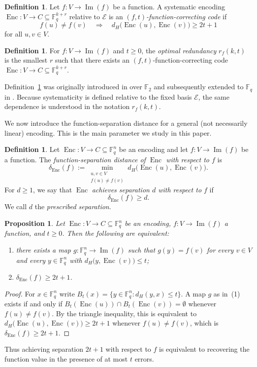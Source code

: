 \documentclass[a4paper,12pt]{article}
\theoremstyle{plain}
\newtheorem{proposition}[lemma]{Proposition}
\theoremstyle{definition}
\newtheorem{definition}[lemma]{Definition}
\newcommand{\F}{\mathbb F}
\newcommand{\Enc}{\operatorname{Enc}}
\newcommand{\Imf}{\operatorname{Im}}
\begin{document}
\begin{definition}
\label{def:fcc}
Let $f\colon V\to\Imf(f)$ be a function. A systematic encoding
$\Enc\colon V\to C\subseteq\F_q^{k+r}$ relative to $\mathcal E$ is an
\emph{$(f,t)$-function-correcting
code} if
\[
f(u)\neq f(v)
\quad\Longrightarrow\quad
 d_H\bigl(\Enc(u),\Enc(v)\bigr)\geq 2t+1
\]
for all $u,v\in V$.
\end{definition}


\begin{definition}
\label{def:optimal-redundancy}
For $f\colon V\to\Imf(f)$ and $t\geq0$, the \emph{optimal
redundancy} $r_f(k,t)$ is the smallest $r$ such that there exists an $(f,t)$-function-correcting code
$\Enc\colon V\to C\subseteq\F_q^{k+r}$.
\end{definition}

Definition~\ref{def:fcc} was  originally introduced in
\cite{lenz2023} over $\F_2$ and subsequently extended to $\F_q$ in \cite{premlal2025,rajput2026}. 
Because systematicity is defined relative to the fixed basis $\mathcal E$, the same dependence is understood in the notation $r_f(k,t)$.


We now introduce the function-separation distance for a general (not necessarily linear) encoding. This is the main parameter we study in this paper.  
\begin{definition}
\label{def:function-separation}
Let $\Enc\colon V\to C\subseteq\F_q^n$ be an encoding and let
$f\colon V\to\Imf(f)$ be a function. The
\emph{function-separation distance of $\Enc$ with respect to $f$} is
\[
\delta_{\Enc}(f)
:=
\min_{\substack{u,v\in V\\ f(u)\neq f(v)}}
d_H\bigl(\Enc(u),\Enc(v)\bigr).
\]
For $d\geq1$, we say that $\Enc$ \emph{achieves separation $d$ with
respect to $f$} if
\[
\delta_{\Enc}(f)\geq d.
\]
We call $d$ the \emph{prescribed separation}.
\end{definition} 

 
\begin{proposition}
\label{prop:separation-criterion}
Let $\Enc\colon V\to C\subseteq\F_q^n$ be an encoding, $f\colon V\to\Imf(f)$ a
function, and $t\ge 0$. Then the following are equivalent:
\begin{enumerate} 
\item there exists a map $g\colon\F_q^n\to\Imf(f)$ such that
$g(y)=f(v)$ for every $v\in V$ and every $y\in\F_q^n$ with
$d_H\bigl(y,\Enc(v)\bigr)\le t$;
\item $\delta_{\Enc}(f)\ge 2t+1$.
\end{enumerate}
\end{proposition}
\begin{proof}
For $x\in\F_q^n$ write $B_t(x)=\{y\in\F_q^n:d_H(y,x)\le t\}$. 
A map $g$ as in~(1) exists if and only if 
$B_t(\Enc(u))\cap B_t(\Enc(v))=\emptyset$ whenever $f(u) \ne f(v)$. 
By the triangle inequality, this is equivalent to
$d_H\bigl(\Enc(u),\Enc(v)\bigr)\ge 2t+1$ whenever $f(u) \ne f(v)$, which is $\delta_{\Enc}(f)\ge 2t+1$.
\end{proof}
Thus achieving separation $2t+1$ with respect to $f$ is equivalent
to recovering the function value in the presence of at most $t$
errors.
\end{document}
